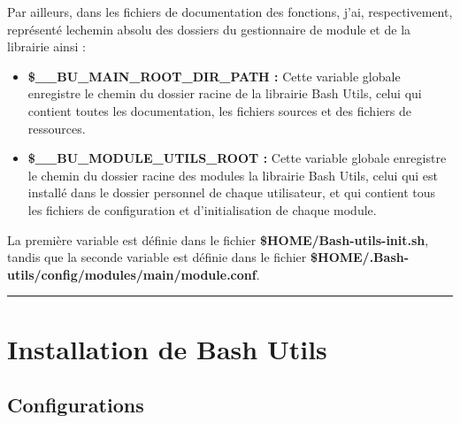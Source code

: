 \documentclass[a4paper,10pt]{article}
\begin{document}
\begin{justify}
    Par ailleurs, dans les fichiers de documentation des fonctions, j'ai, respectivement, représenté le\linebreak chemin absolu des dossiers du gestionnaire de module et de la librairie ainsi :

    \begin{itemize}
        \item \textbf{\color{orange}\$\_\_BU\_MAIN\_ROOT\_DIR\_PATH\color{white} :} Cette variable globale enregistre le chemin du dossier racine de la librairie Bash Utils, celui qui contient toutes les documentation, les fichiers sources et des fichiers de ressources.\\

        \item \textbf{\color{orange}\$\_\_BU\_MODULE\_UTILS\_ROOT\color{white} :} Cette variable globale enregistre le chemin du dossier racine des modules la librairie Bash Utils, celui qui est installé dans le dossier personnel de chaque utilisateur, et qui contient tous les fichiers de configuration et d'initialisation de chaque module.
    \end{itemize}
\end{justify}



\begin{justify}
    La première variable est définie dans le fichier \textbf{\color{lime}\$HOME/Bash-utils-init.sh}, tandis que la seconde variable est définie dans le fichier \textbf{\color{lime}\$HOME/.Bash-utils/config/modules/main/module.conf}.
\end{justify}





\color{red}\par\noindent\rule{\textwidth}{0.4pt}\color{white}

\color{red}
\section{Installation de Bash Utils}\color{white}

\color{green}
\subsection{Configurations}\color{white}
\end{document}
